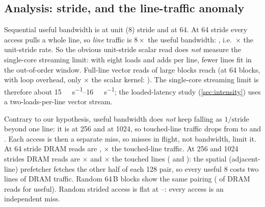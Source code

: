 \subsection{Analysis: stride, and the line-traffic anomaly}
Sequential useful bandwidth is  at unit (\qty{8}{\byte})
stride and  at \qty{64}{\byte}. At \qty{64}{\byte} stride
every access pulls a whole line, so \emph{line} traffic is $8\times$ the useful bandwidth:
, i.e.\ $\times$ the
unit-stride rate. So the obvious unit-stride scalar read does \emph{not} measure the single-core streaming
limit: with eight loads and adds per line, fewer lines fit in the out-of-order window. Full-line vector reads of large blocks reach
 (at \qty{64}{\byte} blocks, with loop overhead, only
$\times$ the scalar kernel: ). The
single-core streaming limit is therefore about \qtyrange{15}{16}{\gibi\byte\per\second}; the loaded-latency
study (\cref{sec:intensity}) uses a two-loads-per-line vector stream.

Contrary to our hypothesis, useful bandwidth does \emph{not} keep falling as
$1/\text{stride}$ beyond one line: it is  at
\qty{256}{\byte} and  at \qty{1024}{\byte}, so touched-line
traffic drops from  to
 and .
Each access is then a separate miss, so misses in flight, not bandwidth, limit it. At \qty{64}{\byte} stride DRAM reads are
, $\times$ the
touched-line traffic. At \qty{256}{\byte} and \qty{1024}{\byte} strides DRAM reads are
$\times$ and $\times$ the touched
lines ( and
): the spatial (adjacent-line) prefetcher fetches the
other half of each \qty{128}{\byte} pair, so every useful \qty{8}{\byte} costs two lines of DRAM traffic.
Random 64\,B blocks show the same pairing ( of DRAM reads
for  useful). Random strided access is flat at
--: every access is an independent
miss.
